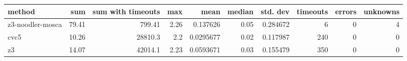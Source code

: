 \begin{tabular}{lrrrrrrrrr}
\hline
 method           &   sum &   sum with timeouts &   max &      mean &   median &   std. dev &   timeouts &   errors &   unknowns \\
\hline
 z3-noodler-mosca & 79.41 &              799.41 &  2.26 & 0.137626  &     0.05 &   0.284672 &          6 &        0 &          4 \\
 cvc5             & 10.26 &            28810.3  &  2.2  & 0.0295677 &     0.02 &   0.117987 &        240 &        0 &          0 \\
 z3               & 14.07 &            42014.1  &  2.23 & 0.0593671 &     0.03 &   0.155479 &        350 &        0 &          0 \\
\hline
\end{tabular}
